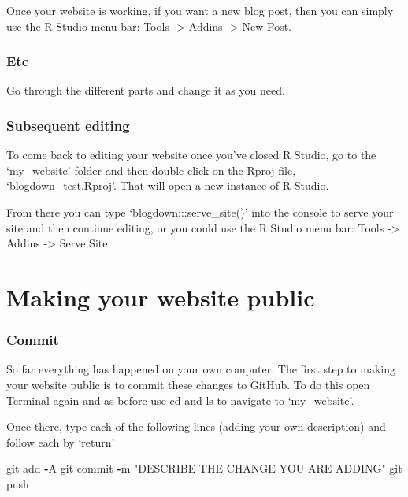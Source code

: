 \documentclass[
]{book}
\newenvironment{Shaded}{\begin{snugshade}}{\end{snugshade}}
\newcommand{\NormalTok}[1]{#1}
\newcommand{\OperatorTok}[1]{\textcolor[rgb]{0.81,0.36,0.00}{\textbf{#1}}}
\newcommand{\StringTok}[1]{\textcolor[rgb]{0.31,0.60,0.02}{#1}}
\begin{document}
Once your website is working, if you want a new blog post, then you can simply use the R Studio menu bar: Tools -\textgreater{} Addins -\textgreater{} New Post.

\hypertarget{etc}{%
\subsubsection{Etc}\label{etc}}

Go through the different parts and change it as you need.

\hypertarget{subsequent-editing}{%
\subsubsection{Subsequent editing}\label{subsequent-editing}}

To come back to editing your website once you've closed R Studio, go to the `my\_website' folder and then double-click on the Rproj file, `blogdown\_test.Rproj'. That will open a new instance of R Studio.

From there you can type `blogdown:::serve\_site()' into the console to serve your site and then continue editing, or you could use the R Studio menu bar:
Tools -\textgreater{} Addins -\textgreater{} Serve Site.

\hypertarget{making-your-website-public}{%
\section{Making your website public}\label{making-your-website-public}}

\hypertarget{commit}{%
\subsubsection{Commit}\label{commit}}

So far everything has happened on your own computer. The first step to making your website public is to commit these changes to GitHub. To do this open Terminal again and as before use cd and ls to navigate to `my\_website'.

Once there, type each of the following lines (adding your own description) and follow each by `return'

\begin{Shaded}
\begin{Highlighting}[]
\NormalTok{git add }\OperatorTok{-}\NormalTok{A}
\NormalTok{git commit }\OperatorTok{-}\NormalTok{m }\StringTok{"DESCRIBE THE CHANGE YOU ARE ADDING"}
\NormalTok{git push}
\end{Highlighting}
\end{Shaded}
\end{document}
